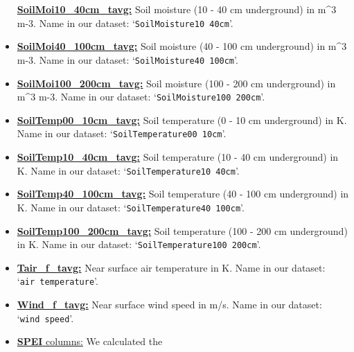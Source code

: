\documentclass[10pt,parskip=half,
toc=sectionentrywithdots,
bibliography=totocnumbered,
captions=tableheading,numbers=noendperiod]{scrartcl}
\begin{document}
\begin{itemize}
  \href{https://developers.google.com/earth-engine/datasets/catalog/NASA_FLDAS_NOAH01_C_GL_M_V001}{\textbf{SoilMoi10\_40cm\_tavg:}}
  Soil moisture (10 - 40 cm underground) in m\^{}3 m-3. Name in our
  dataset: `\texttt{SoilMoisture10\ 40cm}'.
\item
  \href{https://developers.google.com/earth-engine/datasets/catalog/NASA_FLDAS_NOAH01_C_GL_M_V001}{\textbf{SoilMoi40\_100cm\_tavg:}}
  Soil moisture (40 - 100 cm underground) in m\^{}3 m-3. Name in our
  dataset: `\texttt{SoilMoisture40\ 100cm}'.
\item
  \href{https://developers.google.com/earth-engine/datasets/catalog/NASA_FLDAS_NOAH01_C_GL_M_V001}{\textbf{SoilMoi100\_200cm\_tavg:}}
  Soil moisture (100 - 200 cm underground) in m\^{}3 m-3. Name in our
  dataset: `\texttt{SoilMoisture100\ 200cm}'.
\item
  \href{https://developers.google.com/earth-engine/datasets/catalog/NASA_FLDAS_NOAH01_C_GL_M_V001}{\textbf{SoilTemp00\_10cm\_tavg:}}
  Soil temperature (0 - 10 cm underground) in K. Name in our dataset:
  `\texttt{SoilTemperature00\ 10cm}'.
\item
  \href{https://developers.google.com/earth-engine/datasets/catalog/NASA_FLDAS_NOAH01_C_GL_M_V001}{\textbf{SoilTemp10\_40cm\_tavg:}}
  Soil temperature (10 - 40 cm underground) in K. Name in our dataset:
  `\texttt{SoilTemperature10\ 40cm}'.
\item
  \href{https://developers.google.com/earth-engine/datasets/catalog/NASA_FLDAS_NOAH01_C_GL_M_V001}{\textbf{SoilTemp40\_100cm\_tavg:}}
  Soil temperature (40 - 100 cm underground) in K. Name in our dataset:
  `\texttt{SoilTemperature40\ 100cm}'.
\item
  \href{https://developers.google.com/earth-engine/datasets/catalog/NASA_FLDAS_NOAH01_C_GL_M_V001}{\textbf{SoilTemp100\_200cm\_tavg:}}
  Soil temperature (100 - 200 cm underground) in K. Name in our dataset:
  `\texttt{SoilTemperature100\ 200cm}'.
\item
  \href{https://developers.google.com/earth-engine/datasets/catalog/NASA_FLDAS_NOAH01_C_GL_M_V001}{\textbf{Tair\_f\_tavg:}}
  Near surface air temperature in K. Name in our dataset:
  `\texttt{air\ temperature}'.
\item
  \href{https://developers.google.com/earth-engine/datasets/catalog/NASA_FLDAS_NOAH01_C_GL_M_V001}{\textbf{Wind\_f\_tavg:}}
  Near surface wind speed in m/s. Name in our dataset:
  `\texttt{wind\ speed}'.\\
\item
  \href{https://spei.csic.es/}{\textbf{SPEI} columns:} We calculated the

\end{itemize}
\end{document}
